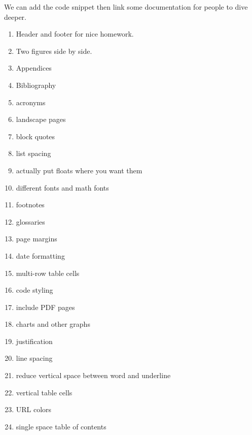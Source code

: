 \documentclass[12pt]{article}
\begin{document}
We can add the code snippet then link some documentation for people to dive deeper.

\begin{enumerate}
  \item Header and footer for nice homework.
  \item Two figures side by side.
  \item Appendices
  \item Bibliography
  \item acronyms
  \item landscape pages
  \item block quotes
  \item list spacing
  \item actually put floats where you want them
  \item different fonts and math fonts
  \item footnotes
  \item glossaries
  \item page margins
  \item date formatting
  \item multi-row table cells
  \item code styling
  \item include PDF pages
  \item charts and other graphs
  \item justification
  \item line spacing
  \item reduce vertical space between word and underline
  \item vertical table cells
  \item URL colors
  \item single space table of contents
\end{enumerate}
\end{document}
